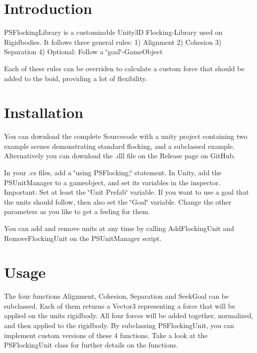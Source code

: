 \hypertarget{index_intro_sec}{}\section{Introduction}\label{index_intro_sec}
P\+S\+Flocking\+Library is a customizable Unity3D Flocking-\/\+Library used on Rigidbodies. It follows three general rules\+: 1) Alignment 2) Cohesion 3) Separation 4) Optional\+: Follow a \char`\"{}goal\char`\"{}-\/\+Game\+Object

Each of these rules can be overriden to calculate a custom force that should be added to the boid, providing a lot of flexibility.\hypertarget{index_install_sec}{}\section{Installation}\label{index_install_sec}
You can download the complete Sourcecode with a unity project containing two example scenes demonstrating standard flocking, and a subclassed example. Alternatively you can download the .dll file on the Release page on Git\+Hub.

In your .cs files, add a \char`\"{}using P\+S\+Flocking;\char`\"{} statement. In Unity, add the P\+S\+Unit\+Manager to a gameobject, and set its variables in the inspector. Important\+: Set at least the \char`\"{}\+Unit Prefab\char`\"{} variable. If you want to use a goal that the units should follow, then also set the \char`\"{}\+Goal\char`\"{} variable. Change the other parameters as you like to get a feeling for them.

You can add and remove units at any time by calling Add\+Flocking\+Unit and Remove\+Flocking\+Unit on the P\+S\+Unit\+Manager script.\hypertarget{index_usage_sec}{}\section{Usage}\label{index_usage_sec}
The four functions Alignment, Cohesion, Separation and Seek\+Goal can be subclassed. Each of them returns a Vector3 representing a force that will be applied on the unit\textquotesingle{}s rigidbody. All four forces will be added together, normalized, and then applied to the rigidbody. By subclassing P\+S\+Flocking\+Unit, you can implement custom versions of these 4 functions. Take a look at the P\+S\+Flocking\+Unit class for further details on the functions. 